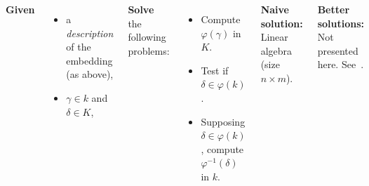 \documentclass[20pt,a0paper,blockverticalspace=7mm]{tikzposter}
\begin{document}
\begin{columns}
{    \textbf{Given}
    \begin{itemize}
    \item a \emph{description} of the embedding (as above),
    \item $\gamma\in k$ and $\delta\in K$,
    \end{itemize}

    \textbf{Solve} the following problems:
    \begin{itemize}
    \item Compute $\varphi(\gamma)$ in $K$.
    \item Test if $\delta\in\varphi(k)$.
    \item Supposing $\delta\in\varphi(k)$, compute $\varphi^{-1}(\delta)$ in $k$.
    \end{itemize}
    
    \textbf{Naive solution:} Linear algebra (size $n\times m$).

    \textbf{Better solutions:} Not presented here. See~\cite{ffisom-long}.
  }


\end{columns}
\end{document}
